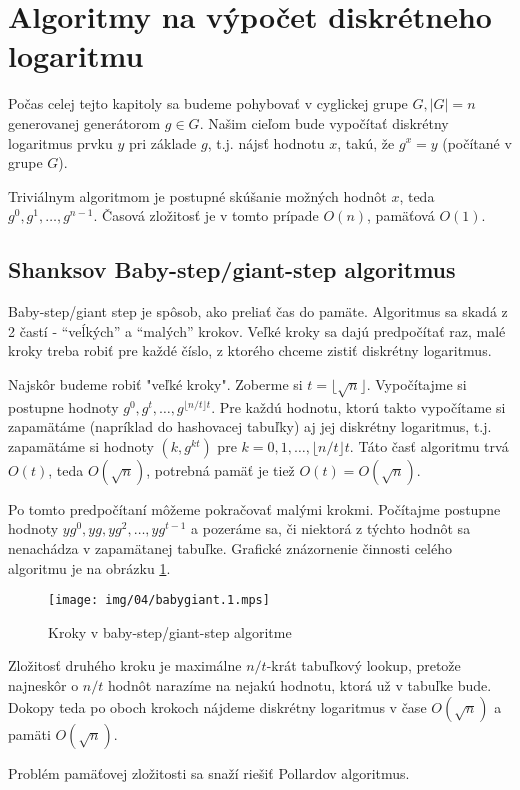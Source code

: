 \section{Algoritmy na výpočet diskrétneho logaritmu}
Počas celej tejto kapitoly sa budeme pohybovať v cyglickej grupe 
$G, |G|=n$ generovanej generátorom $g \in G$.
Našim cieľom bude vypočítať diskrétny logaritmus prvku $y$
pri základe $g$, t.j. nájsť hodnotu $x$, takú, že $g^x=y$ (počítané
v grupe $G$).


Triviálnym algoritmom je postupné skúšanie možných hodnôt $x$, teda
$g^0,g^1,\dots,g^{n-1}$.
Časová zložitosť je v tomto prípade $O(n)$, pamäťová $O(1)$.

\subsection{Shanksov Baby-step/giant-step algoritmus}
Baby-step/giant step je spôsob, ako preliať čas do pamäte.
Algoritmus sa skadá z 2 častí - ``veĺkých'' a ``malých'' krokov.
Veľké kroky sa dajú predpočítať raz, malé kroky treba robiť pre každé
číslo, z ktorého chceme zistiť diskrétny logaritmus.

Najskôr budeme robiť "veľké kroky".
Zoberme si $t=\lfloor \sqrt{n} \rfloor$.
Vypočítajme si postupne hodnoty $g^0,g^t,\dots,g^{\lfloor n/t \rfloor t}$.
Pre každú hodnotu, ktorú takto vypočítame si zapamätáme (napríklad do
hashovacej tabuľky) aj jej diskrétny logaritmus, t.j. zapamätáme si hodnoty
$(k,g^{kt})$ pre $k=0,1,\dots,\lfloor n/t \rfloor t$.
Táto časť algoritmu trvá $O(t)$, teda $O(\sqrt{n})$, potrebná pamäť je
tiež $O(t)=O(\sqrt{n})$.

Po tomto predpočítaní môžeme pokračovať malými krokmi.
Počítajme postupne hodnoty $y g^0,yg,yg^2,\dots, yg^{t-1}$ a pozeráme sa,
či niektorá z týchto hodnôt sa nenachádza v zapamätanej tabuľke.
Grafické znázornenie činnosti celého algoritmu je na obrázku
\ref{fig:babygiant}.
\begin{figure}[h]
    \centering
    \texttt{[image: img/04/babygiant.1.mps]}
    \label{fig:babygiant}
    \caption{Kroky v baby-step/giant-step algoritme}
\end{figure}

Zložitosť druhého kroku je maximálne $n/t$-krát tabuľkový lookup, pretože
najneskôr o $n/t$ hodnôt narazíme na nejakú hodnotu, ktorá už v tabuľke bude.
Dokopy teda po oboch krokoch nájdeme diskrétny logaritmus
v čase $O(\sqrt{n})$ a pamäti $O(\sqrt{n})$.

Problém pamäťovej zložitosti sa snaží riešiť Pollardov algoritmus.

